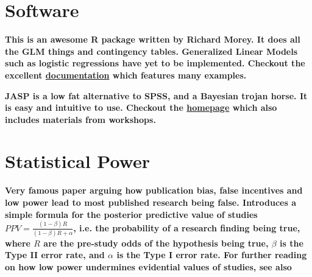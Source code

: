 \documentclass[12pt]{scrartcl}
\begin{document}
\section{Software}
\begin{description}
  \item {}
  
  \item {}
  
  \textbf{This is an awesome R package written by Richard Morey. It does all the GLM things and contingency tables. Generalized Linear Models such as logistic regressions have yet to be implemented. Checkout the excellent \href{http://bayesfactorpcl.r-forge.r-project.org/}{documentation} which features many examples.}
  
  \item {}
  
  \textbf{JASP is a low fat alternative to SPSS, and a Bayesian trojan horse. It is easy and intuitive to use. Checkout the \href{https://jasp-stats.org/}{homepage} which also includes materials from workshops.}
\end{description}




\section{Statistical Power}

\begin{description}
  \item {}
  
  \item {}
  
  \item {}
  
  \item {}
  
  \item {}
  
  \item {}
  
  \item {}
  
  \item {}
  
    \textbf{Very famous paper arguing how publication bias, false incentives and low power lead to most published research being false. Introduces a simple formula for the posterior predictive value of studies $PPV = \frac{(1 - \beta)R}{(1 - \beta)R + \alpha}$, i.e. the probability of a research finding being true, where $R$ are the pre-study odds of the hypothesis being true, $\beta$ is the Type II error rate, and $\alpha$ is the Type I error rate. For further reading on how low power undermines evidential values of studies, see also \cite{button2013power}}
    
  \item {}
\end{description}
\end{document}
